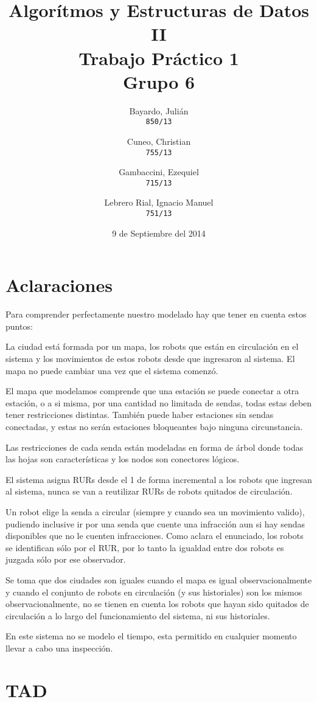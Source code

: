 \documentclass[a4paper,titlepage]{report}
\begin{document}
\title{Algorítmos y Estructuras de Datos II\\
Trabajo Práctico 1\\
Grupo 6}

\author{
	Bayardo, Julián\\
	\texttt{850/13}
	\and
	Cuneo, Christian\\
	\texttt{755/13}
	\and
	Gambaccini, Ezequiel\\
	\texttt{715/13}
	\and
	Lebrero Rial, Ignacio Manuel\\
	\texttt{751/13}
}

\date{9 de Septiembre del 2014}

\maketitle

\section{Aclaraciones}

Para comprender perfectamente nuestro modelado hay que tener en cuenta estos puntos:

La ciudad está formada por un mapa, los robots que están en circulación en el sistema y los movimientos de estos robots desde que ingresaron al sistema. El mapa no puede cambiar una vez que el sistema comenzó.

El mapa que modelamos comprende que una estación se puede conectar a otra estación, o a si misma, por una cantidad no limitada de sendas, todas estas deben tener restricciones distintas. También puede haber estaciones sin sendas conectadas, y estas no serán estaciones bloqueantes bajo ninguna circunstancia.

Las restricciones de cada senda están modeladas en forma de árbol donde todas las hojas son características y los nodos son conectores lógicos.

El sistema asigna RURs desde el 1 de forma incremental a los robots que ingresan al sistema, nunca se van a reutilizar RURs de robots quitados de circulación.

Un robot elige la senda a circular (siempre y cuando sea un movimiento valido), pudiendo inclusive ir por una senda que cuente una infracción aun si hay sendas disponibles que no le cuenten infracciones.
Como aclara el enunciado, los robots se identifican sólo por el RUR, por lo tanto la igualdad entre dos robots es juzgada sólo por ese observador. 

Se toma que dos ciudades son iguales cuando el mapa es igual observacionalmente y cuando el conjunto de robots en circulación (y sus historiales) son los mismos observacionalmente, no se tienen en cuenta los robots que hayan sido quitados de circulación a lo largo del funcionamiento del sistema, ni sus historiales. 

En este sistema no se modelo el tiempo, esta permitido en cualquier momento llevar a cabo una inspección.

\section{TAD}

\end{document}
